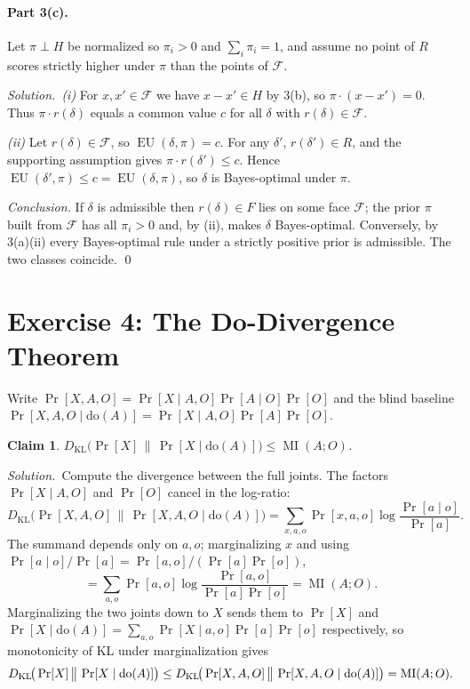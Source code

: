 \documentclass[11pt]{article}
\newcommand{\rd}{r(\delta)}
\newcommand{\DKL}{D_{\mathrm{KL}}}
\DeclareMathOperator{\MI}{MI}
\DeclareMathOperator{\EU}{EU}
\newcommand{\doo}[1]{\mathrm{do}(#1)}
\theoremstyle{plain}
\newtheorem*{claim}{Claim}
\newcommand{\soln}{\medskip\noindent\textit{Solution.}\ }
\begin{document}
\paragraph{Part 3(c).} Let $\pi\perp H$ be normalized so $\pi_i>0$ and $\sum_i\pi_i=1$, and assume no point of $R$ scores strictly higher under $\pi$ than the points of $\mathcal F$.

\soln \emph{(i)} For $x,x'\in\mathcal F$ we have $x-x'\in H$ by 3(b), so $\pi\cdot(x-x')=0$. Thus $\pi\cdot\rd$ equals a common value $c$ for all $\delta$ with $\rd\in\mathcal F$.

\emph{(ii)} Let $\rd\in\mathcal F$, so $\EU(\delta,\pi)=c$. For any $\delta'$, $r(\delta')\in R$, and the supporting assumption gives $\pi\cdot r(\delta')\le c$. Hence $\EU(\delta',\pi)\le c=\EU(\delta,\pi)$, so $\delta$ is Bayes-optimal under $\pi$.

\emph{Conclusion.} If $\delta$ is admissible then $\rd\in F$ lies on some face $\mathcal F$; the prior $\pi$ built from $\mathcal F$ has all $\pi_i>0$ and, by (ii), makes $\delta$ Bayes-optimal. Conversely, by 3(a)(ii) every Bayes-optimal rule under a strictly positive prior is admissible. The two classes coincide. \qed

\section{Exercise 4: The Do-Divergence Theorem}

Write $\Pr[X,A,O]=\Pr[X\mid A,O]\Pr[A\mid O]\Pr[O]$ and the blind baseline $\Pr[X,A,O\mid\doo{A}]=\Pr[X\mid A,O]\Pr[A]\Pr[O]$.

\begin{claim}
$\DKL\!\big(\Pr[X]\,\big\|\,\Pr[X\mid\doo{A}]\big)\le\MI(A;O)$.
\end{claim}

\soln Compute the divergence between the full joints. The factors $\Pr[X\mid A,O]$ and $\Pr[O]$ cancel in the log-ratio:
\[
  \DKL\!\big(\Pr[X,A,O]\,\big\|\,\Pr[X,A,O\mid\doo{A}]\big)
  =\sum_{x,a,o}\Pr[x,a,o]\log\frac{\Pr[a\mid o]}{\Pr[a]}.
\]
The summand depends only on $a,o$; marginalizing $x$ and using $\Pr[a\mid o]/\Pr[a]=\Pr[a,o]/(\Pr[a]\Pr[o])$,
\[
  =\sum_{a,o}\Pr[a,o]\log\frac{\Pr[a,o]}{\Pr[a]\Pr[o]}=\MI(A;O).
\]
Marginalizing the two joints down to $X$ sends them to $\Pr[X]$ and $\Pr[X\mid\doo{A}]=\sum_{a,o}\Pr[X\mid a,o]\Pr[a]\Pr[o]$ respectively, so monotonicity of KL under marginalization gives
\[
  \DKL\!\big(\Pr[X]\,\big\|\,\Pr[X\mid\doo{A}]\big)\le\DKL\!\big(\Pr[X,A,O]\,\big\|\,\Pr[X,A,O\mid\doo{A}]\big)=\MI(A;O). \qedhere
\]
\end{document}
